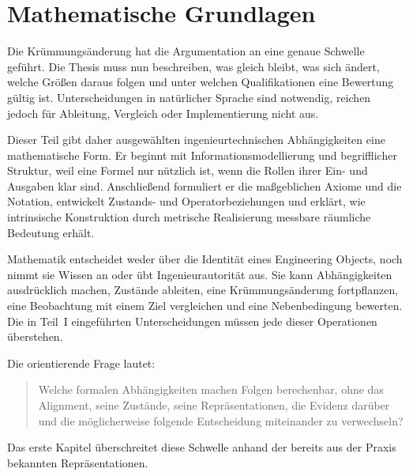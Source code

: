 
\chapter*{Mathematische Grundlagen}
{}

Die Krümmungsänderung hat die Argumentation an eine genaue Schwelle geführt.
Die Thesis muss nun beschreiben, was gleich bleibt, was sich ändert, welche
Größen daraus folgen und unter welchen Qualifikationen eine Bewertung gültig
ist. Unterscheidungen in natürlicher Sprache sind notwendig, reichen jedoch
für Ableitung, Vergleich oder Implementierung nicht aus.

Dieser Teil gibt daher ausgewählten ingenieurtechnischen Abhängigkeiten eine
mathematische Form. Er beginnt mit Informationsmodellierung und begrifflicher
Struktur, weil eine Formel nur nützlich ist, wenn die Rollen ihrer Ein- und
Ausgaben klar sind. Anschließend formuliert er die maßgeblichen Axiome und die
Notation, entwickelt Zustands- und Operatorbeziehungen und erklärt, wie
intrinsische Konstruktion durch metrische Realisierung messbare räumliche
Bedeutung erhält.

Mathematik entscheidet weder über die Identität eines Engineering Objects,
noch nimmt sie Wissen an oder übt Ingenieurautorität aus. Sie kann
Abhängigkeiten ausdrücklich machen, Zustände ableiten, eine
Krümmungsänderung fortpflanzen, eine Beobachtung mit einem Ziel vergleichen
und eine Nebenbedingung bewerten. Die in Teil~I eingeführten
Unterscheidungen müssen jede dieser Operationen überstehen.

Die orientierende Frage lautet:

\begin{quote}
Welche formalen Abhängigkeiten machen Folgen berechenbar, ohne das Alignment,
seine Zustände, seine Repräsentationen, die Evidenz darüber und die
möglicherweise folgende Entscheidung miteinander zu verwechseln?
\end{quote}

Das erste Kapitel überschreitet diese Schwelle anhand der bereits aus der
Praxis bekannten Repräsentationen.
